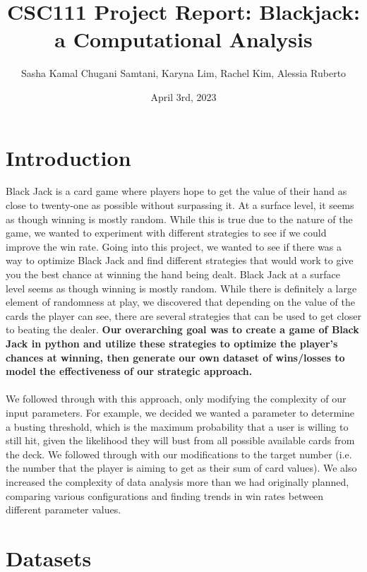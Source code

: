 \documentclass[fontsize=11pt]{article}
\title{CSC111 Project Report: Blackjack: a Computational Analysis}
\author{Sasha Kamal Chugani Samtani, Karyna Lim, Rachel Kim, Alessia Ruberto}
\date{April 3rd, 2023}
\begin{document}
\maketitle

\section*{Introduction}
Black Jack is a card game where players hope to get the value of their hand as close to twenty-one as possible without surpassing it. At a surface level, it seems as though winning is mostly random. While this is true due to the nature of the game, we wanted to experiment with different strategies to see if we could improve the win rate. Going into this project, we wanted to see if there was a way to optimize Black Jack and find different strategies that would work to give you the best chance at winning the hand being dealt. Black Jack at a surface level seems as though winning is mostly random. While there is definitely a large element of randomness at play, we discovered that depending on the value of the cards the player can see, there are several strategies that can be used to get closer to beating the dealer. \textbf{Our overarching goal was to create a game of Black Jack in python and utilize these strategies to optimize the player’s chances at winning, then generate our own dataset of wins/losses to model the effectiveness of our strategic approach.}
\\\\
	We followed through with this approach, only modifying the complexity of our input parameters. For example, we decided we wanted a parameter to determine a busting threshold, which is the maximum probability that a user is willing to still hit, given the likelihood they will bust from all possible available cards from the deck. We followed through with our modifications to the target number (i.e. the number that the player is aiming to get as their sum of card values). We also increased the complexity of data analysis more than we had originally planned, comparing various configurations and finding trends in win rates between different parameter values.


\section*{Datasets}
\end{document}
